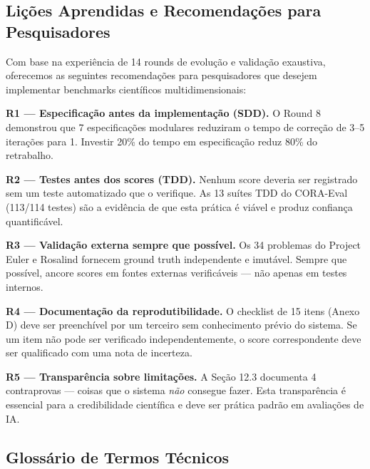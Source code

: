 \subsection{Lições Aprendidas e Recomendações para Pesquisadores}

Com base na experiência de 14 rounds de evolução e validação exaustiva,
oferecemos as seguintes recomendações para pesquisadores que desejem
implementar benchmarks científicos multidimensionais:

\textbf{R1 --- Especificação antes da implementação (SDD).} O Round 8 demonstrou
que 7 especificações modulares reduziram o tempo de correção de 3--5 iterações
para 1. Investir 20\% do tempo em especificação reduz 80\% do retrabalho.

\textbf{R2 --- Testes antes dos scores (TDD).} Nenhum score deveria ser
registrado sem um teste automatizado que o verifique. As 13 suítes TDD do
CORA-Eval (113/114 testes) são a evidência de que esta prática é viável e
produz confiança quantificável.

\textbf{R3 --- Validação externa sempre que possível.} Os 34 problemas do
Project Euler e Rosalind fornecem ground truth independente e imutável. Sempre
que possível, ancore scores em fontes externas verificáveis --- não apenas em
testes internos.

\textbf{R4 --- Documentação da reprodutibilidade.} O checklist de 15 itens
(Anexo D) deve ser preenchível por um terceiro sem conhecimento prévio do
sistema. Se um item não pode ser verificado independentemente, o score
correspondente deve ser qualificado com uma nota de incerteza.

\textbf{R5 --- Transparência sobre limitações.} A Seção 12.3 documenta 4
contraprovas --- coisas que o sistema \textit{não} consegue fazer. Esta
transparência é essencial para a credibilidade científica e deve ser prática
padrão em avaliações de IA.

\subsection{Glossário de Termos Técnicos}

